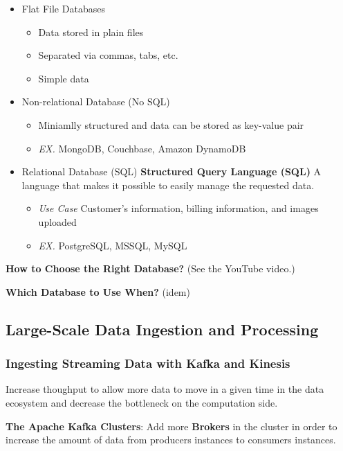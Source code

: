 \documentclass{article}
\begin{document}
\begin{itemize}
    \item Flat File Databases
    \begin{itemize}
        \item Data stored in plain files
        \item Separated via commas, tabs, etc.
        \item Simple data
    \end{itemize}
    \item Non-relational Database (No SQL)
    \begin{itemize}
        \item Miniamlly structured and data can be stored as key-value pair
        \item \textit{EX.} MongoDB, Couchbase, Amazon DynamoDB
    \end{itemize}
    \item Relational Database (SQL) 
    \textbf{Structured Query Language (SQL)} A language that makes it possible to easily manage the requested data.
    \begin{itemize}
        \item \textit{Use Case} Customer's information, billing information, and images uploaded
        \item \textit{EX.} PostgreSQL, MSSQL, MySQL
    \end{itemize}
\end{itemize}

\textbf{How to Choose the Right Database?} (See the YouTube video.)

\textbf{Which Database to Use When?} (idem)

\subsection{Large-Scale Data Ingestion and Processing}

\subsubsection{Ingesting Streaming Data with Kafka and Kinesis}

Increase thoughput to allow more data to move in a given time in the data ecosystem and decrease the bottleneck on the computation side.

\textbf{The Apache Kafka Clusters}: Add more \textbf{Brokers} in the cluster in order to increase the amount of data from producers instances to consumers instances.
\end{document}
